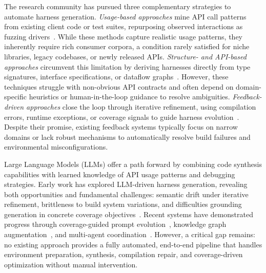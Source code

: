 \documentclass[sigconf,review,anonymous]{acmart}
\begin{document}
The research community has pursued three complementary strategies to automate harness generation. \emph{Usage-based approaches} mine API call patterns from existing client code or test suites, repurposing observed interactions as fuzzing drivers~\cite{DBLP:conf/sigsoft/BabicBCIKKLSW19:FUDGE, DBLP:conf/uss/IspoglouAMP20:FuzzGen, DBLP:conf/sp/JeongJYMKJKSH23:UTopia, DBLP:conf/icse/ZhangZLWLZJ23:Daisy, DBLP:journals/pacmse/WuNH25:WildSync}. While these methods capture realistic usage patterns, they inherently require rich consumer corpora, a condition rarely satisfied for niche libraries, legacy codebases, or newly released APIs. \emph{Structure- and API-based approaches} circumvent this limitation by deriving harnesses directly from type signatures, interface specifications, or dataflow graphs~\cite{DBLP:conf/icse/ZhangLMZ021:IntelliGen, DBLP:conf/icse/GreenA22:GraphFuzz, DBLP:conf/ccs/ChenXLWC23:Hopper, DBLP:conf/issta/XiongDCQWSZ24:Atlas, DBLP:journals/pacmse/ToffaliniBTP25:LibErator, DBLP:conf/icse/ShermanN25:OGHarn, DBLP:conf/ndss/0007ZLSZLQ25:NEXZZER}. However, these techniques struggle with non-obvious API contracts and often depend on domain-specific heuristics or human-in-the-loop guidance to resolve ambiguities. \emph{Feedback-driven approaches} close the loop through iterative refinement, using compilation errors, runtime exceptions, or coverage signals to guide harness evolution~\cite{DBLP:conf/uss/ZhangLZZZZXLL0H23:Rubick, DBLP:journals/pacmse/ToffaliniBTP25:LibErator, DBLP:conf/icse/ShermanN25:OGHarn, DBLP:conf/ndss/0007ZLSZLQ25:NEXZZER}. Despite their promise, existing feedback systems typically focus on narrow domains or lack robust mechanisms to automatically resolve build failures and environmental misconfigurations.

Large Language Models (LLMs) offer a path forward by combining code synthesis capabilities with learned knowledge of API usage patterns and debugging strategies. Early work has explored LLM-driven harness generation, revealing both opportunities and fundamental challenges: semantic drift under iterative refinement, brittleness to build system variations, and difficulties grounding generation in concrete coverage objectives~\cite{DBLP:conf/issta/ZhangZBLMXLSL24:HowEffectiveAreThey, DBLP:conf/sigsoft/Jiang0MCZSWFWLZ24:WhenFuzzingMeetsLLMs}. Recent systems have demonstrated progress through coverage-guided prompt evolution~\cite{DBLP:conf/ccs/LyuXCC24:PromptFuzz}, knowledge graph augmentation~\cite{DBLP:conf/icse/XuMZZCHLW25:CKGFuzzer}, and multi-agent coordination~\cite{DBLP:journals/corr/abs-2507-18289:Scheduzz}. However, a critical gap remains: no existing approach provides a fully automated, end-to-end pipeline that handles environment preparation, synthesis, compilation repair, and coverage-driven optimization without manual intervention.
\end{document}
